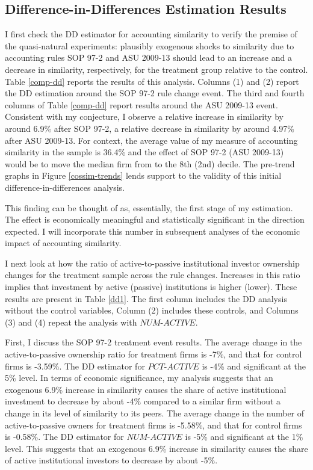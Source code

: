 \documentclass[thesis]{thesis-umich}
\begin{document}
\subsection{Difference-in-Differences Estimation Results} \label{ssec:ddresults}
I first check the DD estimator for accounting similarity to verify the premise of the quasi-natural experiments: plausibly exogenous shocks to similarity due to accounting rules SOP 97-2 and ASU 2009-13 should lead to an increase and a decrease in similarity, respectively, for the treatment group relative to the control. Table \ref{comp-dd} reports the results of this analysis. Columns (1) and (2) report the DD estimation around the SOP 97-2 rule change event. The third and fourth columns of Table \ref{comp-dd} report results around the ASU 2009-13 event. Consistent with my conjecture, I observe a relative increase in similarity by around 6.9\% after SOP 97-2, a relative decrease in similarity by around 4.97\% after ASU 2009-13. For context, the average value of my measure of accounting similarity in the sample is 36.4\% and the effect of SOP 97-2 (ASU 2009-13) would be to move the median firm from to the 8th (2nd) decile. The pre-trend graphs in Figure \ref{cossim-trends} lends support to the validity of this initial difference-in-differences analysis.

This finding can be thought of as, essentially, the first stage of my estimation. The effect is economically meaningful and statistically significant in the direction expected. I will incorporate this number in subsequent analyses of the economic impact of accounting similarity.

I next look at how the ratio of active-to-passive institutional investor ownership changes for the treatment sample across the rule changes. Increases in this ratio implies that investment by active (passive) institutions is higher (lower). These results are present in Table \ref{dd1}. The first column includes the DD analysis without the control variables, Column (2) includes these controls, and Columns (3) and (4) repeat the analysis with $NUM\text{-}ACTIVE$. 

First, I discuss the SOP 97-2 treatment event results. The average change in the active-to-passive ownership ratio for treatment firms is -7\%, and that for control firms is -3.59\%. The DD estimator for $PCT\text{-}ACTIVE$ is -4\% and significant at the 5\% level. In terms of economic significance, my analysis suggests that an exogenous 6.9\% increase in similarity causes the share of active institutional investment to decrease by about -4\%  compared to a similar firm without a change in its level of similarity to its peers. The average change in the number of active-to-passive owners for treatment firms is -5.58\%, and that for control firms is -0.58\%. The DD estimator for $NUM\text{-}ACTIVE$ is -5\% and significant at the 1\% level. This suggests that an exogenous 6.9\% increase in similarity causes the share of active institutional investors to decrease by about -5\%.
\end{document}
